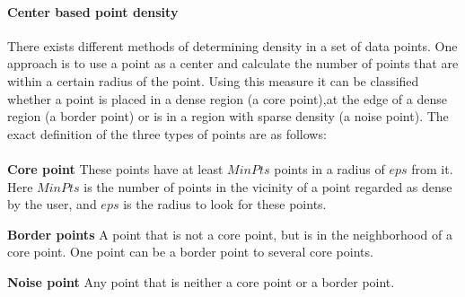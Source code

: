 \paragraph{Center based point density}
There exists different methods of determining density in a set of data points.
One approach is to use a point as a center and calculate the number of points that are within a certain radius of the point.
Using this measure it can be classified whether a point is placed in a dense region (a core point),at the edge of a dense region (a border point) or is in a region with sparse density (a noise point).
The exact definition of the three types of points are as follows\cite{pang2006introduction}:

\paragraph{}

\noindent
\textbf{Core point} These points have at least $ MinPts $ points in a radius of $ eps $ from it. 
Here $ MinPts $ is the number of points in the vicinity of a point regarded as dense by the user, and $ eps $ is the radius to look for these points.

\noindent
\textbf{Border points} A point that is not a core point, but is in the neighborhood of a core point. 
One point can be a border point to several core points.

\noindent
\textbf{Noise point} Any point that is neither a core point or a border point. 

